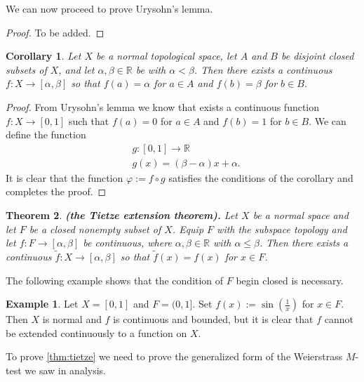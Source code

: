 \documentclass[11pt,a4paper]{article}
\theoremstyle{definition}
\newtheorem{example}{Example}[section]
\theoremstyle{plain}
\newtheorem{theorem}{Theorem}[section]
\newtheorem{corollary}[theorem]{Corollary}
\newcommand{\R}{\mathbb{R}}
\renewcommand{\tt}[1]{\textnormal{\textbf{(#1).}}} %
\begin{document}
  We can now proceed to prove Urysohn's lemma.

  \begin{proof}
    To be added.
  \end{proof}

  \begin{corollary}
    Let $X$ be a normal topological space, let $A$ and $B$ be disjoint closed 
    subsets of $X$, and let $\alpha, \beta \in \R$ be with $\alpha < \beta$.
    Then there exists a continuous $f \colon X \to [\alpha, \beta]$ 
    so that $f(a) = \alpha$ for $a \in A$ and $f(b) = \beta$ for $b \in B$.
  \end{corollary}

  \begin{proof}
    From Urysohn's lemma we know that exists a continuous function 
    $f \colon X \to [0,1]$ such that $f(a) = 0$ for $a \in A$ and
    $f(b) = 1$ for $b \in B$. We can define the function
    \begin{align*}
      &g \colon [0,1] \to \R \\
      &g(x) = (\beta - \alpha)x + \alpha.
    \end{align*}
    It is clear that the function $\varphi := f \circ g$ satisfies the
    conditions of the corollary and completes the proof.
  \end{proof}

  \begin{theorem}\label{thm:tietze}\tt{the Tietze extension theorem}
    Let $X$ be a normal space and let $F$ be a closed nonempty subset of $X$.
    Equip $F$ with the subspace topology
    and let $f \colon F \to [\alpha, \beta]$ be continuous,
    where $\alpha, \beta \in \R$ with $\alpha \le \beta$.
    Then there exists a continuous $\tilde{f} \colon X \to [\alpha, \beta]$
    so that $\tilde{f}(x) = f(x)$ for $x \in F$.
  \end{theorem}
  
  The following example shows that the condition of $F$ begin closed is
  necessary.

  \begin{example}
    Let $X = [0,1]$ and $F = (0,1]$.
    Set $f(x) := \sin\left(\frac {1}{x}\right)$ for $x \in F$.
    Then $X$ is normal and $f$ is continuous and bounded, but it is clear
    that $f$ cannot be extended continuously to a function on $X$.
  \end{example}

  To prove \autoref{thm:tietze} we need to prove the generalized form
  of the Weierstrass $M$-test we saw in analysis.
\end{document}
